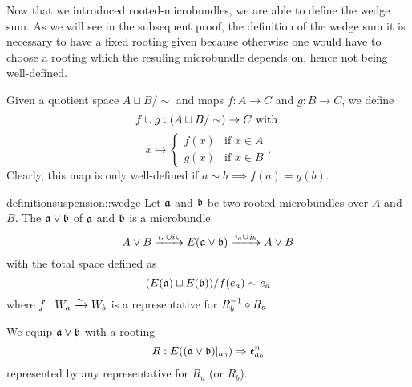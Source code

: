 \begin{myparagraph}
    Now that we introduced rooted-microbundles,
    we are able to define the wedge sum.
    As we will see in the subsequent proof,
    the definition of the wedge sum
    it is necessary to have a fixed rooting given because otherwise
    one would have to choose a rooting which the resuling microbundle depends on,
    hence not being well-defined.

    Given a quotient space $A \sqcup B / \sim$ and maps $f: A \to C$ and $g: B \to C$, we define
    \[ f \cup g: (A \sqcup B / \sim) \to C \text{ with } \]
    \[ x \mapsto \begin{cases} f(x) & \text{if } x \in A \\ g(x) &\text{if } x \in B \end{cases}.\]
    Clearly, this map is only well-defined if $a \sim b \implies f(a) = g(b)$.
\end{myparagraph}

\begin{mystatement}{definition}{suspension::wedge}
    Let $\mathfrak{a}$ and $\bb$ be two rooted microbundles over $A$ and $B$.
    The  $\ba \vee \bb$ of $\mathfrak{a}$ and $\bb$ is a microbundle
    \[ A \vee B \xto{i_a \cup i_b} E(\ba \vee \bb) \xto{j_a \cup j_b} A \vee B \]
    with the total space defined as
    \[ (E(\ba) \sqcup E(\bb)) / f(e_a) \sim e_a \]
    where $f: W_a \xrightarrow{\sim} W_b$ is a representative for $R_b^{-1} \circ R_a$.
    
    We equip $\ba \vee \bb$ with a rooting
    \[ \germdef{R}{E((\ba \vee \bb)\restr{a_0})}{\be{a_0}} \]
    represented by any representative for $R_a$ (or $R_b$).
\end{mystatement}

